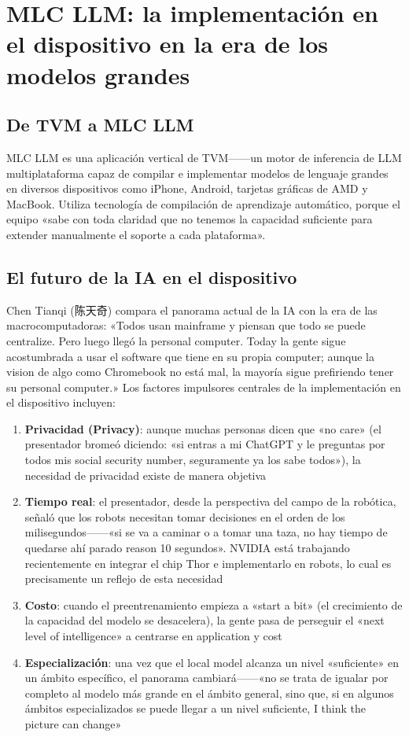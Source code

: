 \section{MLC LLM: la implementación en el dispositivo en la era de los modelos grandes}

\subsection{De TVM a MLC LLM}

MLC LLM es una aplicación vertical de TVM------un motor de inferencia de LLM multiplataforma capaz de compilar e implementar modelos de lenguaje grandes en diversos dispositivos como iPhone, Android, tarjetas gráficas de AMD y MacBook. Utiliza tecnología de compilación de aprendizaje automático, porque el equipo «sabe con toda claridad que no tenemos la capacidad suficiente para extender manualmente el soporte a cada plataforma».

\subsection{El futuro de la IA en el dispositivo}

Chen Tianqi (陈天奇) compara el panorama actual de la IA con la era de las macrocomputadoras: «Todos usan mainframe y piensan que todo se puede centralize. Pero luego llegó la personal computer. Today la gente sigue acostumbrada a usar el software que tiene en su propia computer; aunque la vision de algo como Chromebook no está mal, la mayoría sigue prefiriendo tener su personal computer.» Los factores impulsores centrales de la implementación en el dispositivo incluyen:

\begin{enumerate}
    \item \textbf{Privacidad (Privacy)}: aunque muchas personas dicen que «no care» (el presentador bromeó diciendo: «si entras a mi ChatGPT y le preguntas por todos mis social security number, seguramente ya los sabe todos»), la necesidad de privacidad existe de manera objetiva
    \item \textbf{Tiempo real}: el presentador, desde la perspectiva del campo de la robótica, señaló que los robots necesitan tomar decisiones en el orden de los milisegundos------«si se va a caminar o a tomar una taza, no hay tiempo de quedarse ahí parado reason 10 segundos». NVIDIA está trabajando recientemente en integrar el chip Thor e implementarlo en robots, lo cual es precisamente un reflejo de esta necesidad
    \item \textbf{Costo}: cuando el preentrenamiento empieza a «start a bit» (el crecimiento de la capacidad del modelo se desacelera), la gente pasa de perseguir el «next level of intelligence» a centrarse en application y cost
    \item \textbf{Especialización}: una vez que el local model alcanza un nivel «suficiente» en un ámbito específico, el panorama cambiará------«no se trata de igualar por completo al modelo más grande en el ámbito general, sino que, si en algunos ámbitos especializados se puede llegar a un nivel suficiente, I think the picture can change»
\end{enumerate}

